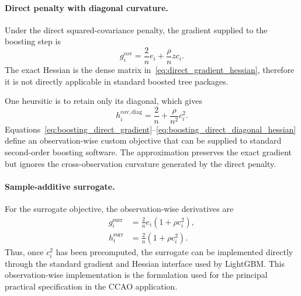 \documentclass[10pt]{article}
\theoremstyle{definition}
\newcommand{\1}{\mathbf{1}}
\begin{document}
{{{\paragraph{Direct penalty with diagonal curvature.}
Under the direct squared-covariance penalty, the gradient supplied to the boosting step is
\begin{equation}
\label{eq:boosting_direct_gradient}
g_i^{\mathrm{cov}}
=
\frac{2}{n}e_i
+
\frac{\rho}{n}z c_i.
\end{equation}
The exact Hessian is the dense matrix in~\eqref{eq:direct_gradient_hessian}, therefore it is not directly applicable in standard boosted tree packages. 

One heursitic is to retain only its diagonal, which gives
\begin{equation}
\label{eq:boosting_direct_diagonal_hessian}
h_i^{\mathrm{cov,diag}}
=
\frac{2}{n}
+
\frac{\rho}{n^2}c_i^2.
\end{equation}
Equations~\eqref{eq:boosting_direct_gradient}--\eqref{eq:boosting_direct_diagonal_hessian} define an observation-wise custom objective that can be supplied to standard second-order boosting software. The approximation preserves the exact gradient but ignores the cross-observation curvature generated by the direct penalty.



\paragraph{Sample-additive surrogate.}
For the surrogate objective, the observation-wise derivatives are
\begin{align}
\label{eq:boosting_surrogate_gradient_hessian}
g_i^{\mathrm{surr}}
&=
\frac{2}{n}e_i\left(1+\rho c_i^2\right),
\\
h_i^{\mathrm{surr}}
&=
\frac{2}{n}\left(1+\rho c_i^2\right).
\end{align}
Thus, once \(c_i^2\) has been precomputed, the surrogate can be implemented directly through the standard gradient and Hessian interface used by LightGBM. This observation-wise implementation is the formulation used for the principal practical specification in the CCAO application.



}}}
\end{document}
